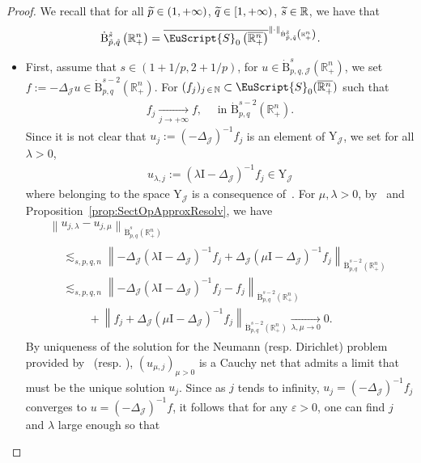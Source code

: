 \documentclass[AHL,Unicode,longabstracts,published]{cedram}
\newcommand{\bbR}{\mathbb{R}}
\newcommand{\bbN}{\mathbb{N}}
\newcommand{\rmB}{\mathrm{B}}
\newcommand{\rmI}{\mathrm{I}}
\newcommand{\rmY}{\mathrm{Y}}
\newcommand{\clJ}{\mathcal{J}}
\newcommand{\eus}{\EuScript}
\let\oldtilde\tilde
\renewcommand*{\tilde}[1]{\mathchoice{\widetilde{#1}}{\widetilde{#1}}{\oldtilde{#1}}{\oldtilde{#1}}}
\begin{document}
\begin{proof}
We recall that for all $\tilde{p}\in(1,+\infty)$, $\tilde{q}\in[1,+\infty)$, $\tilde{s}\in\bbR$, we have that
\begin{align*}
\dot{\rmB}^{\tilde{s}}_{\tilde{p},\tilde{q}}\left(\bbR^n_+\right) = \overline{\eus{S}_0\left(\overline{\bbR^n_+}\right)}^{\|\cdot\|_{\dot{\rmB}^{\tilde{s}}_{\tilde{p},\tilde{q}}\left(\bbR^n_+\right)}} .
\end{align*}
\begin{itemize}
\item First, assume that $s\in(1+1/p,2+1/p)$, for $u\in\dot{\rmB}^{s}_{p,q,\clJ}(\bbR^n_+)$, we set $f:=-\Delta_{\clJ}u \in\dot{\rmB}^{s-2}_{p,q}(\bbR^n_+)$. For $(f_j)_{j\,\in\,\bbN} \subset \eus{S}_0(\overline{\bbR^n_+})$ such that
\begin{align*}
f_j \xrightarrow[j\rightarrow +\infty]{} f,\quad \text{ in } \dot{\rmB}^{s-2}_{p,q}\left(\bbR^n_+\right).
\end{align*}
Since it is not clear that $u_j:=(-\Delta_{\clJ})^{-1}f_j $ is an element of $\rmY_\clJ$, we set for all $\lambda>0$,
\begin{align*}
u_{\lambda,j}:= (\lambda\rmI -\Delta_{\clJ})^{-1}f_j \in \rmY_{\clJ}
\end{align*}
where belonging to the space $\rmY_{\clJ}$ is a consequence of~\cite[Propositions~5.4~\&~5.6]{Gaudin2022}. For $\mu,\lambda>0$, by~\cite[Propositions~5.7~\&~5.8]{Gaudin2022} and Proposition~\ref{prop:SectOpApproxResolv}, we have
\begin{multline*}
\left\| u_{j,\lambda}-u_{j,\mu} \right\|_{\dot{\rmB}^{s}_{p,q}\left(\bbR^n_+\right)}\\
\begin{aligned}
&\lesssim_{s,p,q,n} \left\| -\Delta_{\clJ}\left(\lambda\rmI -\Delta_{\clJ}\right)^{-1}f_j + \Delta_{\clJ}\left(\mu\rmI -\Delta_{\clJ}\right)^{-1}f_j \right\|_{\dot{\rmB}^{s-2}_{p,q}\left(\bbR^n_+\right)}\\
&\lesssim_{s,p,q,n} \left\| -\Delta_{\clJ}\left(\lambda\rmI -\Delta_{\clJ}\right)^{-1}f_j -f_j\right\|_{\dot{\rmB}^{s-2}_{p,q}\left(\bbR^n_+\right)}\\
&\qquad\:+\left\| f_j + \Delta_{\clJ}\left(\mu\rmI -\Delta_{\clJ}\right)^{-1}f_j\right\|_{\dot{\rmB}^{s-2}_{p,q}\left(\bbR^n_+\right)}
\xrightarrow[\lambda,\mu\rightarrow 0]{} 0 .
\end{aligned}
\end{multline*}
By uniqueness of the solution for the Neumann (resp. Dirichlet) problem provided by~\cite[Proposition~5.8]{Gaudin2022} (resp. \cite[Proposition~5.7]{Gaudin2022}), $(u_{\mu,j})_{\mu>0}$ is a Cauchy net that admits a limit that must be the unique solution $u_j$. Since as $j$ tends to infinity, $u_j=(-\Delta_\clJ)^{-1}f_j$ converges to $u=(-\Delta_\clJ)^{-1}f$, it follows that for any $\varepsilon>0$, one can find $j$ and $\lambda$ large enough so that

\end{itemize}
\end{proof}
\end{document}
